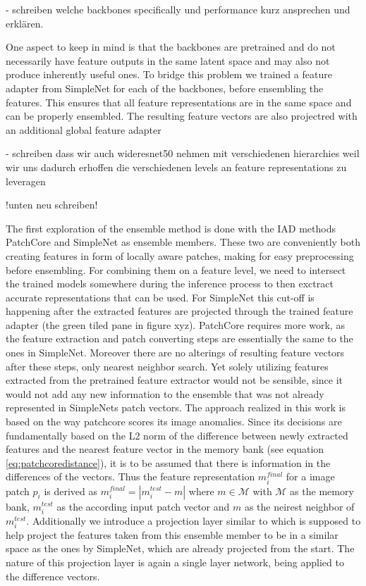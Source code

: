 - schreiben welche backbones specifically und performance kurz ansprechen und erklären.

One aspect to keep in mind is that the backbones are pretrained and do not necessarily have feature outputs in the same latent space %
and may also not produce inherently useful ones. To bridge this problem we trained a feature adapter from SimpleNet for each of the backbones, before ensembling the features. 
This ensures that all feature representations are in the same space and can be properly ensembled. The resulting feature vectors are also projectred with an additional global 
feature adapter

- schreiben dass wir auch wideresnet50 nehmen mit verschiedenen hierarchies weil wir uns dadurch erhoffen die verschiedenen levels an feature representations zu leveragen




!unten neu schreiben!


The first exploration of the ensemble method is done with the IAD methods PatchCore \cite{patchCore2022} and SimpleNet \cite{liu2023simplenet} as ensemble members. These two 
are conveniently both creating features in form of locally aware patches, making for easy preprocessing before ensembling. For combining them on a 
feature level, we need to intersect the trained models somewhere during the inference process to then exctract accurate representations that can be used. 
For SimpleNet this cut-off is happening after the extracted features are projected through the trained feature adapter (the green tiled pane in figure xyz). 
PatchCore requires more work, as the feature extraction and patch converting steps are essentially the same to the ones in SimpleNet. Moreover there are no alterings of resulting feature vectors 
after these steps, only nearest neighbor search. Yet solely utilizing features extracted 
from the pretrained feature extractor would not be sensible, since it would not add any new information to the ensemble that was not already represented in SimpleNets patch vectors. 
The approach realized in this work is based on the way patchcore scores its image anomalies. Since its decisions are fundamentally based on the L2 norm of the difference between newly extracted 
features and the nearest feature vector in the memory bank (see equation \ref{eq:patchcoredistance}), it is to be assumed that there is information in the differences of the vectors. Thus the 
feature representation $m^{final}_i$ for a image patch $p_i$ is derived as $m^{final}_i = | m_i^{test} - m |$ where $m \in \mathcal{M}$ with $\mathcal{M}$ as the memory bank, $m_i^{test}$ as the 
according input patch vector and $m$ as the neirest neighbor of $m_i^{test}$. Additionally we introduce a projection layer similar to \cite{liu2023simplenet} which is supposed to help project the 
features taken from this ensemble member to be in a similar space as the ones by SimpleNet, which are already projected from the start. The nature of this projection layer is again a single 
layer network, being applied to the difference vectors.



